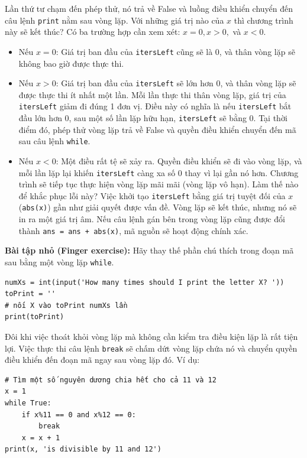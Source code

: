 Lần thứ tư chạm đến phép thử, nó trả về False và luồng điều khiển chuyển đến câu lệnh \texttt{print} nằm sau vòng lặp. Với những giá trị nào của $x$ thì chương trình này sẽ kết thúc? Có ba trường hợp cần xem xét: $x = 0, x > 0,$ và $x < 0$.

\begin{itemize}
    \item Nếu $x = 0$: Giá trị ban đầu của \texttt{itersLeft} cũng sẽ là 0, và thân vòng lặp sẽ không bao giờ được thực thi.
    
    \item Nếu $x > 0$: Giá trị ban đầu của \texttt{itersLeft} sẽ lớn hơn 0, và thân vòng lặp sẽ được thực thi ít nhất một lần. Mỗi lần thực thi thân vòng lặp, giá trị của \texttt{itersLeft} giảm đi đúng 1 đơn vị. Điều này có nghĩa là nếu \texttt{itersLeft} bắt đầu lớn hơn 0, sau một số lần lặp hữu hạn, \texttt{itersLeft} sẽ bằng 0. Tại thời điểm đó, phép thử vòng lặp trả về False và quyền điều khiển chuyển đến mã sau câu lệnh \texttt{while}.
    
    \item Nếu $x < 0$: Một điều rất tệ sẽ xảy ra. Quyền điều khiển sẽ đi vào vòng lặp, và mỗi lần lặp lại khiến \texttt{itersLeft} càng xa số 0 thay vì lại gần nó hơn. Chương trình sẽ tiếp tục thực hiện vòng lặp mãi mãi (vòng lặp vô hạn). Làm thế nào để khắc phục lỗi này? Việc khởi tạo \texttt{itersLeft} bằng giá trị tuyệt đối của $x$ (\texttt{abs(x)}) gần như giải quyết được vấn đề. Vòng lặp sẽ kết thúc, nhưng nó sẽ in ra một giá trị âm. Nếu câu lệnh gán bên trong vòng lặp cũng được đổi thành \texttt{ans = ans + abs(x)}, mã nguồn sẽ hoạt động chính xác.
\end{itemize}

\noindent \textbf{Bài tập nhỏ (Finger exercise):} Hãy thay thế phần chú thích trong đoạn mã sau bằng một vòng lặp \texttt{while}.

\begin{verbatim}
numXs = int(input('How many times should I print the letter X? '))
toPrint = ''
# nối X vào toPrint numXs lần
print(toPrint)
\end{verbatim}

Đôi khi việc thoát khỏi vòng lặp mà không cần kiểm tra điều kiện lặp là rất tiện lợi. Việc thực thi câu lệnh \texttt{break} sẽ chấm dứt vòng lặp chứa nó và chuyển quyền điều khiển đến đoạn mã ngay sau vòng lặp đó. Ví dụ:

\begin{verbatim}
# Tìm một số nguyên dương chia hết cho cả 11 và 12
x = 1
while True:
    if x%11 == 0 and x%12 == 0:
        break
    x = x + 1
print(x, 'is divisible by 11 and 12')
\end{verbatim}

